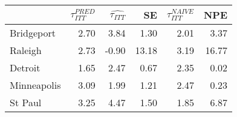 
\begin{tabular}{lrrrrr}
\toprule
  & $\tau_{ITT}^{PRED}$ & $\hat{\tau_{ITT}}$ & SE & $\tau_{ITT}^{NAIVE}$ & NPE\\
\midrule
Bridgeport & 2.70 & 3.84 & 1.30 & 2.01 & 3.37\\
Raleigh & 2.73 & -0.90 & 13.18 & 3.19 & 16.77\\
Detroit & 1.65 & 2.47 & 0.67 & 2.35 & 0.02\\
Minneapolis & 3.09 & 1.99 & 1.21 & 2.47 & 0.23\\
St Paul & 3.25 & 4.47 & 1.50 & 1.85 & 6.87\\
\bottomrule
\end{tabular}